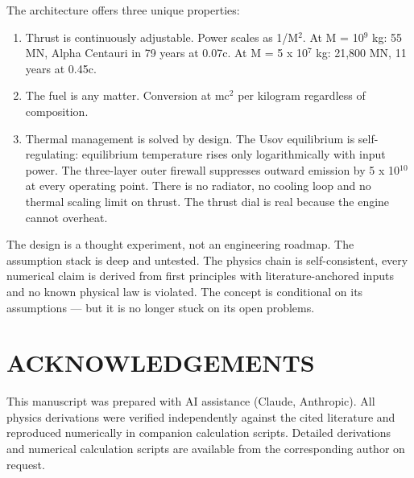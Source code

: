 \documentclass[12pt,a4paper]{article}
\begin{document}
The architecture offers three unique properties:

\begin{enumerate}
\item Thrust is continuously adjustable. Power scales as 1/M$^{2}$. At M = 10$^{9}$ kg: 55 MN, Alpha Centauri in 79 years at 0.07c. At M = 5 x 10$^{7}$ kg: 21,800 MN, 11 years at 0.45c.
\item The fuel is any matter. Conversion at mc$^{2}$ per kilogram regardless of composition.
\item Thermal management is solved by design. The Usov equilibrium is self-regulating: equilibrium temperature rises only logarithmically with input power. The three-layer outer firewall suppresses outward emission by 5 x 10$^{10}$ at every operating point. There is no radiator, no cooling loop and no thermal scaling limit on thrust. The thrust dial is real because the engine cannot overheat.
\end{enumerate}
The design is a thought experiment, not an engineering roadmap. The assumption stack is deep and untested. The physics chain is self-consistent, every numerical claim is derived from first principles with literature-anchored inputs and no known physical law is violated. The concept is conditional on its assumptions --- but it is no longer stuck on its open problems.

\section*{ACKNOWLEDGEMENTS}
This manuscript was prepared with AI assistance (Claude, Anthropic). All physics derivations were verified independently against the cited literature and reproduced numerically in companion calculation scripts. Detailed derivations and numerical calculation scripts are available from the corresponding author on request.
\end{document}
